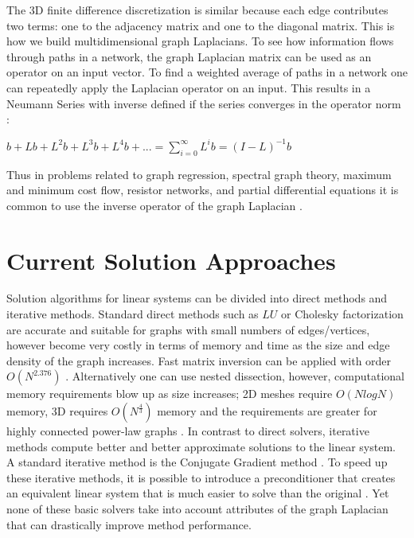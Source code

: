 The 3D finite difference discretization is similar because each edge contributes two terms: one to the adjacency matrix and one to the diagonal matrix. This is how we build multidimensional graph Laplacians.
To see how information flows through paths in a network, the graph Laplacian matrix can be used as an operator on an input vector. To find a weighted average of paths in a network one can repeatedly apply the Laplacian operator on an input. This results in a Neumann Series with inverse defined if the series converges in the operator norm \cite{Neumann:1877,Kantorovich:1982}:\\
\begin{center}
$b + Lb + L^{2}b + L^{3}b + L^{4}b + ... = \sum_{i = 0}^{\infty} L^{i}b = (I-L)^{-1}b$\\
\end{center}
Thus in problems related to graph regression, spectral graph theory, maximum and minimum cost flow, resistor networks, and partial differential equations it is common to use the inverse operator of the graph Laplacian \cite{Spielman:2010}.

\section{Current Solution Approaches}
Solution algorithms for linear systems can be divided into direct methods and iterative methods. Standard direct methods such as $LU$ or Cholesky factorization are accurate and suitable for graphs with small numbers of edges/vertices, however become very costly in terms of memory and time as the size and edge density of the graph increases. Fast matrix inversion can be applied with order $O(N^{2.376})$ \cite{Spielman:2010}. Alternatively one can use nested dissection, however, computational memory requirements blow up as size increases; 2D meshes require $O(N log N)$ memory, 3D requires $O(N^{\frac{4}{3}})$ memory and the requirements are greater for highly connected power-law graphs \cite{Khaira:1992}. In contrast to direct solvers, iterative methods compute better and better approximate solutions to the linear system. A standard iterative method is the Conjugate Gradient method \cite{Hestenes:1952}. To speed up these iterative methods, it is possible to introduce a preconditioner that creates an equivalent linear system that is much easier to solve than the original \cite{Saad:2003}. Yet none of these basic solvers take into account attributes of the graph Laplacian that can drastically improve method performance.


